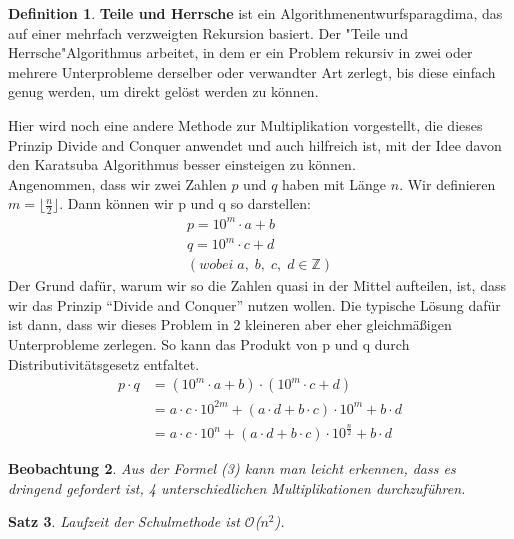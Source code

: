 \documentclass[11pt,a4paper, twoside]{article}
\newtheorem{theorem}{Satz}
\newtheorem{observation}[theorem]{Beobachtung}
\theoremstyle{definition}
\newtheorem{definition}[theorem]{Definition}
\begin{document}
\begin{definition}
\textbf{Teile und Herrsche} ist ein Algorithmenentwurfsparagdima, das auf einer mehrfach verzweigten Rekursion basiert. Der "Teile und Herrsche"\-Algorithmus arbeitet, in dem er ein Problem rekursiv in zwei oder mehrere Unterprobleme derselber oder verwandter Art zerlegt, bis diese einfach genug werden, um direkt gelöst werden zu können. 
\end{definition}

Hier wird noch eine andere Methode zur Multiplikation vorgestellt, die dieses Prinzip Divide and Conquer anwendet und auch hilfreich ist, mit der Idee davon den Karatsuba Algorithmus besser einsteigen zu können. \\

Angenommen, dass wir zwei Zahlen $p$ und $q$ haben mit Länge $n$. Wir definieren $m = \lfloor \frac{n}{2} \rfloor$. Dann können wir p und q so darstellen: 
\begin{align*}
p = 10^{m} \cdot a + b\\
q = 10^{m} \cdot c + d\\
(wobei \;a, \;b, \;c, \;d \in \mathbb{Z})
\end{align*}
 Der Grund dafür, warum wir so die Zahlen quasi in der Mittel aufteilen, ist, dass wir das Prinzip “Divide and Conquer” nutzen wollen. Die typische Lösung dafür ist dann, dass wir dieses Problem in 2 kleineren aber eher gleichmäßigen Unterprobleme zerlegen.
So kann das Produkt von p und q durch Distributivitätsgesetz entfaltet.
\begin{align}
p \cdot q &= (10^{m} \cdot a + b) \cdot (10^{m} \cdot c + d)\\
&= a \cdot c \cdot 10^{2m} + (a \cdot d + b \cdot c) \cdot 10^{m} + b \cdot d\\
&= a \cdot c \cdot 10^{n} + (a \cdot d + b \cdot c) \cdot 10^{\frac{n}{2}} + b \cdot d
\end{align}

\begin{observation}
Aus der Formel (3) kann man leicht erkennen, dass es dringend gefordert ist, 4 unterschiedlichen Multiplikationen durchzuführen.
\end{observation}

\begin{theorem}
Laufzeit der Schulmethode ist $\mathcal{O}$($n^{2}$).
\end{theorem}
\end{document}
